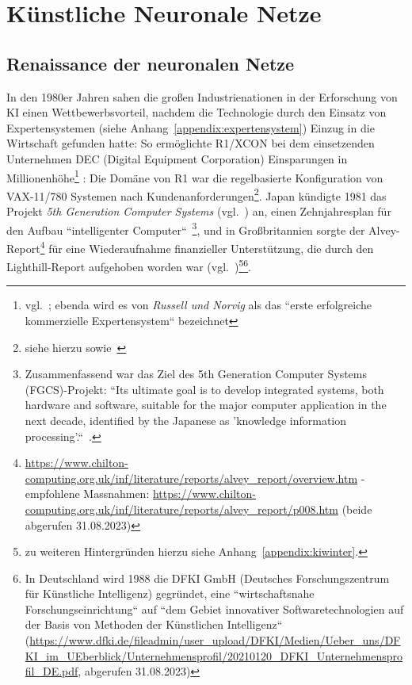 \chapter{Künstliche Neuronale Netze}\label{ch:knn}


\section{Renaissance der neuronalen Netze}\label{renaissance}


In den 1980er Jahren sahen die großen Industrienationen in der Erforschung von KI einen Wettbewerbsvorteil, nachdem die Technologie durch den Einsatz von Expertensystemen (siehe Anhang~\ref{appendix:expertensystem}) Einzug in die Wirtschaft gefunden hatte: So ermöglichte R1/XCON bei dem einsetzenden Unternehmen DEC (Digital Equipment Corporation) Einsparungen in Millionenhöhe\footnote{
    vgl.~\cite[48]{RN09}; ebenda wird es von \textit{Russell und Norvig} als das ``erste erfolgreiche kommerzielle Expertensystem`` bezeichnet
} : Die Domäne von R1 war die regelbasierte Konfiguration von VAX-11/780 Systemen nach Kundenanforderungen\footnote{
    siehe hierzu \cite{Mcd80} sowie~\cite[63]{Hor90}
}.
Japan kündigte 1981 das Projekt \textit{5th Generation Computer Systems} (vgl.~\cite{Gar19}) an, einen Zehnjahresplan für den Aufbau ``intelligenter Computer``~\cite[48]{RN09}\footnote{
    Zusammenfassend war das Ziel des 5th Generation Computer Systems (FGCS)-Projekt: ``Its ultimate goal is to develop integrated systems, both hardware and software, suitable for the major computer application in the next decade, identified by the Japanese as 'knowledge information processing'.``~\cite[637]{Sha83}.
}, und in Großbritannien sorgte der Alvey-Report\footnote{
    \url{https://www.chilton-computing.org.uk/inf/literature/reports/alvey\_report/overview.htm} - empfohlene Massnahmen: \url{https://www.chilton-computing.org.uk/inf/literature/reports/alvey\_report/p008.htm} (beide abgerufen 31.08.2023)
} für eine Wiederaufnahme finanzieller Unterstützung, die durch den Lighthill-Report aufgehoben worden war (vgl.~\cite[48]{RN09})\footnote{
    zu weiteren Hintergründen hierzu siehe Anhang~\ref{appendix:kiwinter}.
}\footnote{
    In Deutschland wird 1988 die DFKI GmbH (Deutsches Forschungszentrum für Künstliche Intelligenz) gegründet, eine ``wirtschaftsnahe Forschungseinrichtung`` auf ``dem Gebiet innovativer Softwaretechnologien auf der Basis von Methoden der Künstlichen Intelligenz`` (\url{https://www.dfki.de/fileadmin/user\_upload/DFKI/Medien/Ueber\_uns/DFKI\_im\_UEberblick/Unternehmensprofil/20210120\_DFKI\_Unternehmensprofil\_DE.pdf}, abgerufen 31.08.2023)
}.

